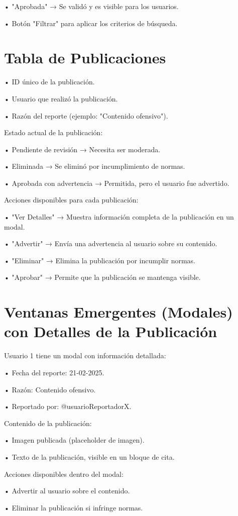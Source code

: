\documentclass[11pt, a4paper, oneside]{book}
\begin{document}
• "Aprobada" → Se validó y es visible para los usuarios.


• Botón "Filtrar" para aplicar los criterios de búsqueda.

\section{Tabla de Publicaciones } 


• ID único de la publicación.

• Usuario que realizó la publicación.

• Razón del reporte (ejemplo: "Contenido ofensivo").

Estado actual de la publicación:

• Pendiente de revisión → Necesita ser moderada.

• Eliminada → Se eliminó por incumplimiento de normas.

• Aprobada con advertencia → Permitida, pero el usuario fue advertido.

Acciones disponibles para cada publicación:

• "Ver Detalles" → Muestra información completa de la publicación en un modal.

• "Advertir" → Envía una advertencia al usuario sobre su contenido.

• "Eliminar" → Elimina la publicación por incumplir normas.

• "Aprobar" → Permite que la publicación se mantenga visible. 

\section{Ventanas Emergentes (Modales) con Detalles de la Publicación} 

Usuario 1 tiene un modal con información detallada:

• Fecha del reporte: 21-02-2025.

• Razón: Contenido ofensivo.

• Reportado por: @usuarioReportadorX.

Contenido de la publicación:

• Imagen publicada (placeholder de imagen).

• Texto de la publicación, visible en un bloque de cita.

Acciones disponibles dentro del modal:

• Advertir al usuario sobre el contenido.

• Eliminar la publicación si infringe normas.
\end{document}
